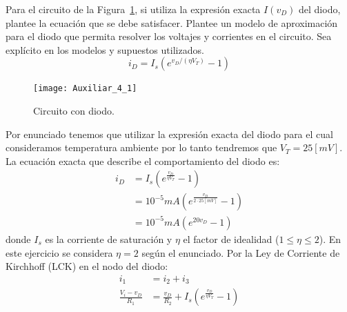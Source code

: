 \documentclass[
  11pt,
  letterpaper,
   addpoints,
   answers
  ]{exam}
\begin{document}
\begin{questions}
\question
Para el circuito de la Figura~\ref{fig:1}, si utiliza la expresión exacta $I(v_D)$ del diodo, plantee la ecuación que se debe satisfacer. Plantee un modelo de aproximación para el diodo que permita resolver los voltajes y corrientes en el circuito. Sea explícito en los modelos y supuestos utilizados.
\begin{equation}
  i_D = I_s \left( e^{v_D/(\eta V_T)} - 1 \right)
\end{equation}

\begin{figure}[H]
    \centering
    \texttt{[image: Auxiliar\_4\_1]}
    \caption{Circuito con diodo.}
    \label{fig:1}
\end{figure}
\begin{solution}
Por enunciado tenemos que utilizar la expresión exacta del diodo para el cual consideramos temperatura ambiente por lo tanto tendremos que $V_{T}=25[mV]$. La ecuación exacta que describe el comportamiento del diodo es:
\begin{align}
    i_D &= I_s\left(e^{\frac{v_D}{\eta V_T}} - 1\right) \label{eq:shockley}\\
    &= 10^{-5}mA\left(e^{\frac{v_D}{2 \cdot 25[mV]}} - 1\right)\\
    &=10^{-5}mA(e^{20v_{D}}-1)
\end{align}
donde $I_s$ es la corriente de saturación y $\eta$ el factor de idealidad ($1 \leq \eta \leq 2$). En este ejercicio se considera $\eta = 2$ según el enunciado. Por la Ley de Corriente de Kirchhoff (LCK) en el nodo del diodo:
\begin{align}
    i_1 &= i_2 + i_3 \\
\frac{V_i - v_D}{R_1} &= \frac{v_D}{R_2} + I_s\left(e^{\frac{v_D}{\eta V_T}} - 1\right) \label{eq:kcl}
\end{align}


\end{solution}
\end{questions}
\end{document}
